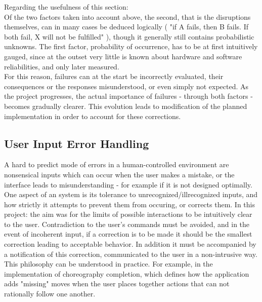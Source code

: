 Regarding the usefulness of this section:\\

Of the two factors taken into account above, the second, that is the disruptions themselves, can in many cases be deduced logically ( "if A fails, then B fails. If both fail, X will not be fulfilled" ), though it generally still contains probabilistic unknowns. The first factor, probability of occurrence, has to be at first intuitively gauged, since at the outset very little is known about hardware and software reliabilities, and only later measured.\\

For this reason, failures can at the start be incorrectly evaluated, their consequences or the responses misunderstood, or even simply not expected. As the project progresses, the actual importance of failures - through both factors - becomes gradually clearer.  This evolution leads to modification of the planned implementation in order to account for these corrections.

\subsection{User Input Error Handling}

A hard to predict mode of errors in a human-controlled environment are nonsensical inputs which can occur when the user makes a mistake, or the interface leads to misunderstanding - for example if it is not designed optimally.\\ 

One aspect of an system is its tolerance to unrecognized/illrecognized inputs, and how strictly it attempts to prevent them from occuring, or corrects them. In this project: the aim was for the limits of possible interactions to be intuitively clear to the user. Contradiction to the user's commands must be avoided, and in the event of incoherent input, if a correction is to be made it should be the smallest correction leading to acceptable behavior. In addition it must be accompanied by a notification of this correction, communicated to the user in a non-intrusive way.\\

This philosophy can be understood in practice. For example, in the implementation of choreography completion, which defines how the application adds "missing" moves when the user places together actions that can not rationally follow one another.



